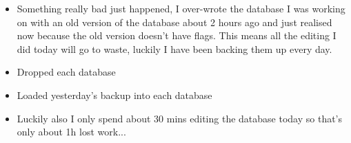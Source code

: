 \documentclass[12pt]{article}
\begin{document}
\begin{itemize}
\begin{itemize}
    \end{itemize}
    \item Something really bad just happened, I over-wrote the database I was working on with an old version of the database about 2 hours ago and just realised now because the old version doesn't have flags. This means all the editing I did today will go to waste, luckily I have been backing them up every day.
    \item Dropped each database
    \item Loaded yesterday's backup into each database
    \item Luckily also I only spend about 30 mins editing the database today so that's only about 1h lost work...
    
    
\end{itemize}
\end{document}
